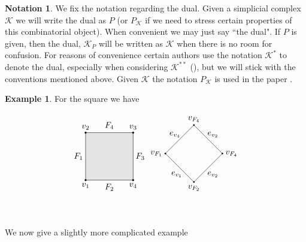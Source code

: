 \documentclass[oneside,12pt]{amsart}
\theoremstyle{definition}
\newtheorem{Notation}[Theorem]{Notation}
\newtheorem{Example}[Theorem]{Example}
\numberwithin{equation}{section}
\begin{document}
\begin{Notation}
We fix the notation regarding the dual.  Given a simplicial complex $\mathcal{K}$ we will write the dual as $P$ (or $P_{\mathcal{K}}$ if we need to stress certain properties of this combinatorial object).  When convenient we may just say ``the dual".  If $P$ is given, then the dual, $\mathcal{K}_P$ will be written as $\mathcal{K}$ when there is no room for confusion.  For reasons of convenience certain authors use the notation $\mathcal{K}^*$ to denote the dual, especially when considering $\mathcal{K}^{**}$ (\cite{G}), but we will stick with the conventions mentioned above.  Given $\mathcal{K}$ the notation $P_{\mathcal{K}}$ is used in the paper \cite{DJ}.
\end{Notation}

\begin{Example}\label{Dual Square}
For the square we have \\
\begin{minipage}{\linewidth}
$$
\begin{tikzpicture}
\filldraw[color=gray!20] (0,0)--(0,2)--(2,2)--(2,0)--(0,0);
\draw (0,0)--(0,2)--(2,2)--(2,0)--(0,0);
\filldraw[black] (0,0) node[below=.1pt]{$v_1$} circle (1pt);
\filldraw[black] (0,2) node[above=.1pt]{$v_2$} circle (1pt);
\filldraw[black] (2,2) node[above=.1pt]{$v_3$} circle (1pt);
\filldraw[black] (2,0) node[below=.1pt]{$v_4$} circle (1pt);
\draw (-.3,1) node{$F_1$} ;
\draw (1,2.3) node{$F_4$} ;
\draw (2.3,1) node{$F_3$} ;
\draw (1,-.3) node{$F_2$} ;
\end{tikzpicture}
\begin{tikzpicture}[scale=.8]
\draw (0,-.5)--(-1.5,1)--(0,2.5)--(1.5,1)--(0,-.5);
\filldraw[black] (0,-.5) node[below=.1pt]{$v_{F_2}$} circle (1pt);
\filldraw[black] (-1.5,1) node[left=.1pt]{$v_{F_1}$} circle (1pt);
\filldraw[black] (0,2.5) node[above=.1pt]{$v_{F_4}$} circle (1pt);
\filldraw[black] (1.5,1) node[right=.1pt]{$v_{F_4}$} circle (1pt);
\draw (-.9,-.1) node{$e_{v_1}$} ;
\draw (-1,2) node{$e_{v_4}$} ;
\draw (1,-.1) node{$e_{v_2}$} ;
\draw (1,2) node{$e_{v_2}$} ;
\end{tikzpicture}$$
\end{minipage}\\[2ex]
\end{Example}

We now give a slightly more complicated example
\end{document}
